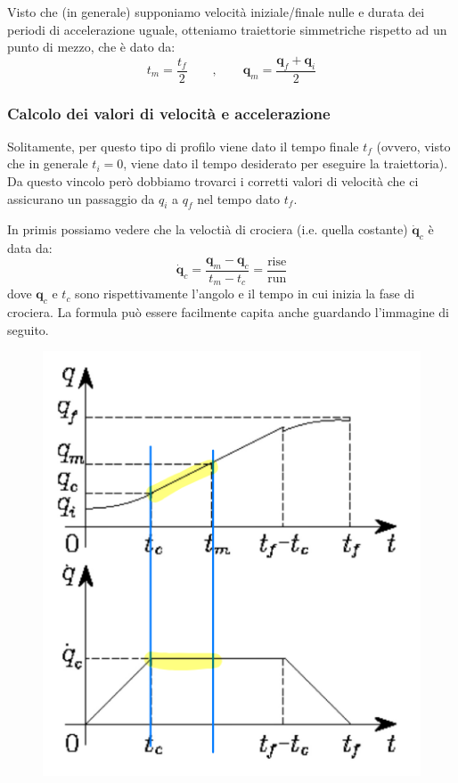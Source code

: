 Visto che (in generale) supponiamo velocità iniziale/finale nulle e durata dei periodi di accelerazione uguale, otteniamo traiettorie simmetriche rispetto ad un punto di mezzo, che è dato da:
$$
t_m = \frac{t_f}{2}
\qquad , \qquad
\bm{q}_m = \frac{\bm{q}_f + \bm{q}_i}{2}
$$


\vspace*{10pt}
\subsubsection{Calcolo dei valori di velocità e accelerazione}
Solitamente, per questo tipo di profilo viene dato il tempo finale $t_f$ (ovvero, visto che in generale $t_i = 0$, viene dato il tempo desiderato per eseguire la traiettoria). Da questo vincolo però dobbiamo trovarci i corretti valori di velocità che ci assicurano un passaggio da $q_i$ a $q_f$ nel tempo dato $t_f$.

In primis possiamo vedere che la veloctià di crociera (i.e. quella costante) $\bm{\dot{q}}_c$ è data da:
$$
\bm{\dot{q}}_c 
= 
\frac{\bm{q}_m - \bm{q}_c}{t_m - t_c}
=
\frac{\text{rise}}{\text{run}}
$$
dove $\bm{q}_c$ e $t_c$ sono rispettivamente l'angolo e il tempo in cui inizia la fase di crociera. La formula può essere facilmente capita anche guardando l'immagine di seguito.

\begin{figure}[H]
	\centering
	\includegraphics[width=0.35\linewidth]{images/trajectories_8}
	\label{fig:trajectories8}
\end{figure}

